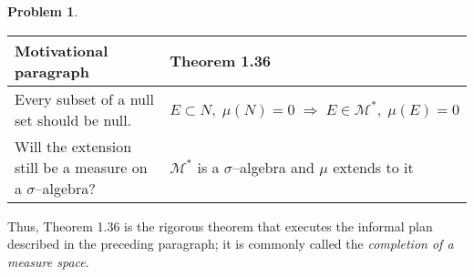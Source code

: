 \documentclass[12pt]{article}
\theoremstyle{definition} %
\newtheorem{problem}{Problem}
\theoremstyle{plain} %
\begin{document}
\begin{problem}
\begin{enumerate}

\begin{center}
  \begin{tabular}{@{}p{} p{}@{}}
  \toprule
  \textbf{Motivational paragraph} & \textbf{Theorem 1.36} \\ \midrule
  Every subset of a null set should be null. 
  & $E\subset N,\; \mu(N)=0 \;\Longrightarrow\; E\in\mathcal{M}^{*},\; \mu(E)=0$ \\[4pt]
  Will the extension still be a measure on a $\sigma$--algebra? 
  & $\mathcal{M}^{*}$ is a $\sigma$--algebra and $\mu$ extends to it \\ \bottomrule
  \end{tabular}
  \end{center}

            Thus, Theorem 1.36 is the rigorous theorem that executes the informal plan described in the preceding paragraph; it is commonly called the \emph{completion of a measure space}.
  \end{enumerate}
\end{problem}
\end{document}
